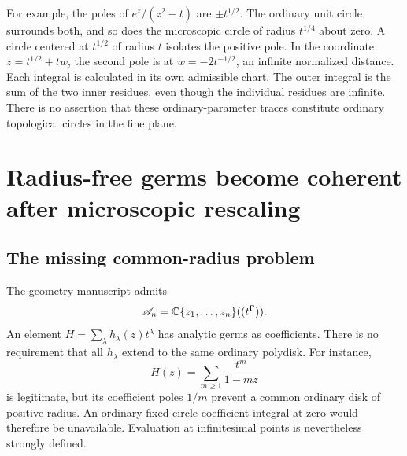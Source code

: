 \documentclass[11pt,letterpaper]{article}
\theoremstyle{definition}
\theoremstyle{remark}
\numberwithin{equation}{section}
\begin{document}
For example, the poles of $e^z/(z^2-t)$ are $\pm t^{1/2}$. The ordinary unit circle surrounds both, and so does the microscopic circle of radius $t^{1/4}$ about zero. A circle centered at $t^{1/2}$ of radius $t$ isolates the positive pole. In the coordinate $z=t^{1/2}+tw$, the second pole is at $w=-2t^{-1/2}$, an infinite normalized distance. Each integral is calculated in its own admissible chart. The outer integral is the sum of the two inner residues, even though the individual residues are infinite. There is no assertion that these ordinary-parameter traces constitute ordinary topological circles in the fine plane.

\section{Radius-free germs become coherent after microscopic rescaling}\label{sec:radiusfree}

\subsection{The missing common-radius problem}
The geometry manuscript admits
\begin{equation}\label{eq:radiusfree-ring}
 \mathscr A_n=\mathbb C\{z_1,\ldots,z_n\}((t^\Gamma)).
\end{equation}
An element $H=\sum_\lambda h_\lambda(z)t^\lambda$ has analytic germs as coefficients. There is no requirement that all $h_\lambda$ extend to the same ordinary polydisk. For instance,
\begin{equation}\label{eq:shrinking}
 H(z)=\sum_{m\ge1}\frac{t^m}{1-mz}
\end{equation}
is legitimate, but its coefficient poles $1/m$ prevent a common ordinary disk of positive radius. An ordinary fixed-circle coefficient integral at zero would therefore be unavailable. Evaluation at infinitesimal points is nevertheless strongly defined.
\end{document}
